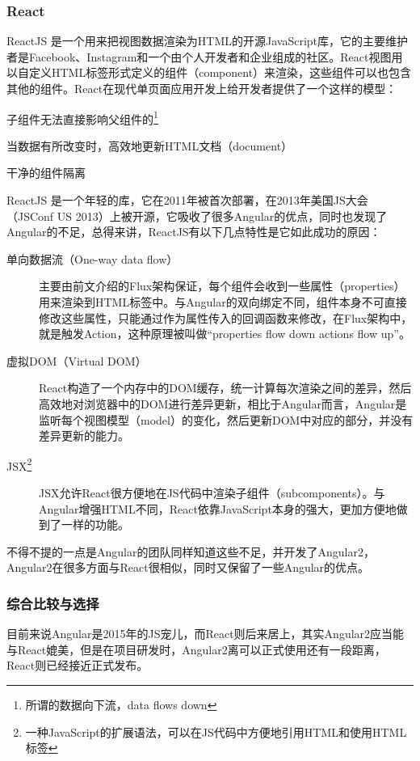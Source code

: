 \subsubsection{React}
ReactJS 是一个用来把视图数据渲染为HTML的开源JavaScript库，它的主要维护者是Facebook、Instagram和一个由个人开发者和企业组成的社区。React视图用以自定义HTML标签形式定义的组件（component）来渲染，这些组件可以也包含其他的组件。React在现代单页面应用开发上给开发者提供了一个这样的模型：
\begin{enumerate*}
  \item 子组件无法直接影响父组件的\footnote{所谓的数据向下流，data flows down}
  \item 当数据有所改变时，高效地更新HTML文档（document）
  \item 干净的组件隔离
\end{enumerate*}

ReactJS 是一个年轻的库，它在2011年被首次部署，在2013年美国JS大会（JSConf US 2013）上被开源，它吸收了很多Angular的优点，同时也发现了Angular的不足，总得来讲，ReactJS有以下几点特性是它如此成功的原因：

\begin{description}
  \item[单向数据流（One-way data flow）] 主要由前文介绍的Flux架构保证，每个组件会收到一些属性（properties）用来渲染到HTML标签中。与Angular的双向绑定不同，组件本身不可直接修改这些属性，只能通过作为属性传入的回调函数来修改，在Flux架构中，就是触发Action，这种原理被叫做“properties flow down actions flow up”。
  \item[虚拟DOM（Virtual DOM）] React构造了一个内存中的DOM缓存，统一计算每次渲染之间的差异，然后高效地对浏览器中的DOM进行差异更新，相比于Angular而言，Angular是监听每个视图模型（model）的变化，然后更新DOM中对应的部分，并没有差异更新的能力。
  \item[JSX\footnote{一种JavaScript的扩展语法，可以在JS代码中方便地引用HTML和使用HTML标签}] JSX允许React很方便地在JS代码中渲染子组件（subcomponents）。与Angular增强HTML不同，React依靠JavaScript本身的强大，更加方便地做到了一样的功能。
\end{description}

不得不提的一点是Angular的团队同样知道这些不足，并开发了Angular2，Angular2在很多方面与React很相似，同时又保留了一些Angular的优点。

\subsubsection{综合比较与选择}
目前来说Angular是2015年的JS宠儿，而React则后来居上，其实Angular2应当能与React媲美，但是在项目研发时，Angular2离可以正式使用还有一段距离，React则已经接近正式发布。

